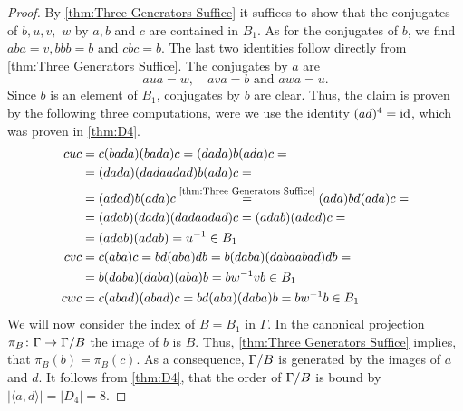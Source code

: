 \begin{proof}
By \cref{thm:Three Generators Suffice} it suffices to show that the conjugates of $b,u,v,$ $w$ by $a,b$ and $c$ are contained in $B_1$. As for the conjugates of $b$, we find $aba=v, bbb=b$ and $cbc=b$. The last two identities follow directly from \cref{thm:Three Generators Suffice}. The conjugates by $a$ are
\begin{equation*}
aua=w, \quad ava=b \text{ and } awa=u.
\end{equation*}
Since $b$ is an element of $B_1$, conjugates by $b$ are clear. Thus, the claim is proven by the following three computations, were we use the identity $(ad)^4=\id$, which was proven in \cref{thm:D4}.
\begin{align*}
cuc	&=c(bada)(bada)c=(dada)b(ada)c=\\
	&=(dada)(dadaadad)b(ada)c=\\
	&=(adad)b(ada)c\overset{\text{\cref{thm:Three Generators Suffice}}}{=}(ada)bd(ada)c=\\
	&=(adab)(dada)(dadaadad)c=(adab)(adad)c=\\
	&=(adab)(adab)=u^{-1}\in B_1\\
cvc	&=c(aba)c=bd(aba)db=b(daba)(dabaabad)db=\\
	&=b(daba)(daba)(aba)b=bw^{-1}vb\in B_1\\
cwc	&=c(abad)(abad)c=bd(aba)(daba)b=bw^{-1}b\in B_1
\end{align*}
We will now consider the index of $B=B_1$ in $\Gamma$. In the canonical projection $\pi_B\colon\Gamma\to\nicefrac{\Gamma}{B}$ the image of $b$ is $B$. Thus, \cref{thm:Three Generators Suffice} implies, that $\pi_B(b)=\pi_B(c)$. As a consequence, $\nicefrac{\Gamma}{B}$ is generated by the images of $a$ and $d$. It follows from \cref{thm:D4}, that the order of $\nicefrac{\Gamma}{B}$ is bound by $\lvert\langle a,d\rangle\rvert=\lvert D_4\rvert=8$.


\end{proof}
